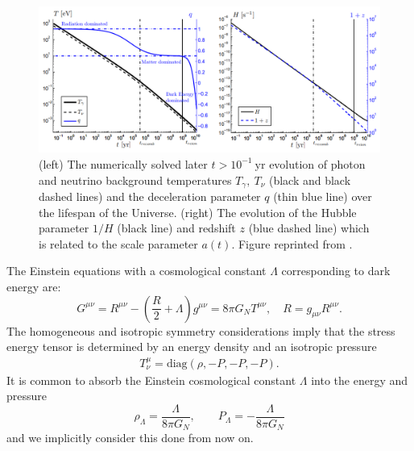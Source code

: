 \documentclass[universe,article,submit,moreauthors,pdftex,a4paper]{Definitions/mdpi}
\newcommand{\beqn}{\begin{equation}}
\newcommand{\eeqn}{\end{equation}}
\begin{document}
\begin{figure}[h]
  \centering
  \includegraphics[width=\textwidth]{./plots/deceleration_evolution}
  \caption{ (left) The numerically solved later $t>10^{-1}\ \mathrm{yr}$ evolution of photon and neutrino background temperatures $T_{\gamma},\ T_{\nu}$ (black and black dashed lines) and the deceleration parameter $q$ (thin blue line) over the lifespan of the Universe. (right) The evolution of the Hubble parameter $1/H$ (black line) and redshift $z$ (blue dashed line) which is related to the scale parameter $a(t)$. Figure reprinted from \cite{Rafelski:2013yka}.}
  \label{deceleration_evolution} 
\end{figure}

The Einstein equations with a cosmological constant $\Lambda$ corresponding to dark energy are:
\beqn\label{Einstine}
G^{\mu\nu}=R^{\mu\nu}-\left(\frac R 2 +\Lambda\right) g^{\mu\nu}=8\pi G_N T^{\mu\nu},  
\quad R= g_{\mu\nu}R^{\mu\nu}.
\eeqn
The homogeneous and isotropic symmetry considerations imply that the stress energy tensor is determined by an energy density and an isotropic pressure
\begin{align}
 T^\mu_\nu =\mathrm{diag}(\rho, -P, -P, -P).
\end{align}
It is common to absorb the Einstein cosmological constant $\Lambda$ into the energy and pressure
\beqn\label{EpsLam}
\rho_\Lambda=\frac{\Lambda}{8\pi G_N}, \qquad P_\Lambda=-\frac{\Lambda}{8\pi G_N}
\eeqn
and we implicitly consider this done from now on.
\end{document}

